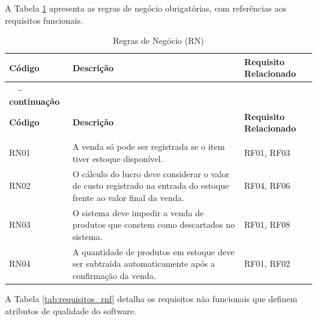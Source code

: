 \documentclass[
	12pt,				%
	openany,			%
	oneside,			%
	a4paper,			%
	english,			%
	french,				%
	spanish,			%
	brazil				%
	]{abntex2}
\begin{document}
A Tabela \ref{tab:requisitos_rn} apresenta as regras de negócio obrigatórias, com referências aos requisitos funcionais.


\begin{longtable}{|>{\centering\arraybackslash}m{1.5cm}|>{\raggedright\arraybackslash}m{9cm}|>{\centering\arraybackslash}m{4cm}|}
    \caption{Regras de Negócio (RN)}
    \label{tab:requisitos_rn}\\
    \hline
    \textbf{Código} & \textbf{Descrição} & \textbf{Requisito Relacionado} \\ 
    \hline
    \endfirsthead

    \multicolumn{3}{c}%
    {{\bfseries \tablename\ \thetable{} -- continuação}} \\
    \hline
    \textbf{Código} & \textbf{Descrição} & \textbf{Requisito Relacionado} \\ 
    \hline
    \endhead
    \hline
    \multicolumn{3}{|r|}{{Continua...}} \\
    \hline
    \endfoot
    \hline
    \endlastfoot
     
    RN01 & A venda só pode ser registrada se o item tiver estoque disponível. & RF01, RF03 \\ 
    \hline
    RN02 & O cálculo do lucro deve considerar o valor de custo registrado na entrada do estoque frente ao valor final da venda. & RF04, RF06 \\ 
    \hline
    RN03 & O sistema deve impedir a venda de produtos que constem como descartados no sistema. & RF01, RF08 \\ 
    \hline
    RN04 & A quantidade de produtos em estoque deve ser subtraída automaticamente após a confirmação da venda. & RF01, RF02 \\ 
    \hline
\end{longtable}

A Tabela \ref{tab:requisitos_rnf} detalha os requisitos não funcionais que definem atributos de qualidade do software.
\end{document}

